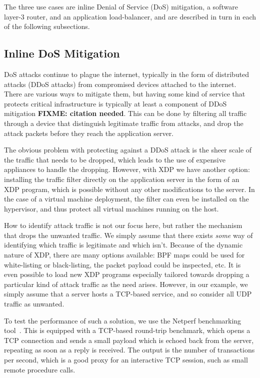 \documentclass[10pt,sigconf]{acmart}
\begin{document}
The three use cases are inline Denial of Service (DoS) mitigation, a software
layer-3 router, and an application load-balancer, and are described in turn in
each of the following subsections.

\subsection{Inline DoS Mitigation}
\label{sec:dos-usecase}
DoS attacks continue to plague the internet, typically in the form of
distributed attacks (DDoS attacks) from compromised devices attached to the
internet. There are various ways to mitigate them, but having some kind of
service that protects critical infrastructure is typically at least a component
of DDoS mitigation \textbf{FIXME: citation needed}. This can be done by
filtering all traffic through a device that distinguish legitimate traffic from
attacks, and drop the attack packets before they reach the application server.

The obvious problem with protecting against a DDoS attack is the sheer scale of
the traffic that needs to be dropped, which leads to the use of expensive
appliances to handle the dropping. However, with XDP we have another option:
installing the traffic filter directly on the application server in the form of
an XDP program, which is possible without any other modifications to the server.
In the case of a virtual machine deployment, the filter can even be installed on
the hypervisor, and thus protect all virtual machines running on the host.

How to identify attack traffic is not our focus here, but rather the mechanism
that drops the unwanted traffic. We simply assume that there exists \emph{some}
way of identifying which traffic is legitimate and which isn't. Because of the
dynamic nature of XDP, there are many options available: BPF maps could be used
for white-listing or black-listing, the packet payload could be inspected, etc.
It is even possible to load new XDP programs especially tailored towards
dropping a particular kind of attack traffic as the need arises. However, in our
example, we simply assume that a server hosts a TCP-based service, and so
consider all UDP traffic as unwanted.

To test the performance of such a solution, we use the Netperf benchmarking
tool~\cite{netperf}. This is equipped with a TCP-based round-trip benchmark,
which opens a TCP connection and sends a small payload which is echoed back from
the server, repeating as soon as a reply is received. The output is the number
of transactions per second, which is a good proxy for an interactive TCP
session, such as small remote procedure calls.
\end{document}
